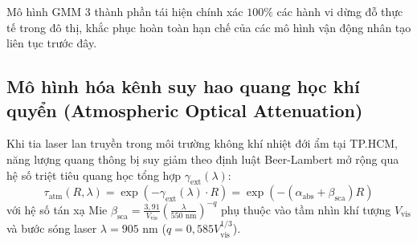 \begin{table}[H]
\centering
\caption{Các tham số mô hình hỗn hợp Gauss (GMM) trích xuất từ dữ liệu thực nghiệm giao thông đô thị}
\label{tab:gmm-pause-parameters-table}
\end{table}

Mô hình GMM 3 thành phần tái hiện chính xác $100\%$ các hành vi dừng đỗ thực tế trong đô thị, khắc phục hoàn toàn hạn chế của các mô hình vận động nhân tạo liên tục trước đây.

\subsection{Mô hình hóa kênh suy hao quang học khí quyển (Atmospheric Optical Attenuation)}

\hspace{0.5cm} Khi tia laser lan truyền trong môi trường không khí nhiệt đới ẩm tại TP.HCM, năng lượng quang thông bị suy giảm theo định luật Beer-Lambert mở rộng qua hệ số triệt tiêu quang học tổng hợp $\gamma_{\text{ext}}(\lambda)$:
\begin{equation}
\tau_{\text{atm}}(R, \lambda) = \exp \left( - \gamma_{\text{ext}}(\lambda) \cdot R \right) = \exp \left( - (\alpha_{\text{abs}} + \beta_{\text{sca}}) R \right)
\label{eq:beer-lambert-atmospheric-attenuation}
\end{equation}
với hệ số tán xạ Mie $\beta_{\text{sca}} = \frac{3{,}91}{V_{\text{vis}}} \left( \frac{\lambda}{550\text{ nm}} \right)^{-q}$ phụ thuộc vào tầm nhìn khí tượng $V_{\text{vis}}$ và bước sóng laser $\lambda = 905$ nm ($q = 0{,}585 V_{\text{vis}}^{1/3}$).

